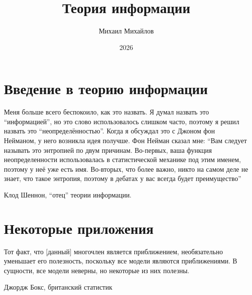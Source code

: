 \documentclass{lecturenotes}
\title{Теория информации}
\author{Михаил Михайлов}
\date{2026}
\begin{document}
\maketitle
\newpage
\tableofcontents
\newpage

\setlength{\epigraphwidth}{0.75\linewidth}
\renewcommand{\textflush}{flushepinormal}

\chapter{Введение в теорию информации}
\epigraph{Меня больше всего беспокоило, как это назвать. Я думал назвать это \enquote{информацией}, но это слово использовалось слишком часто, поэтому я решил назвать это \enquote{неопределённостью}. Когда я обсуждал это с Джоном фон Нейманом, у него возникла идея получше. Фон Нейман сказал мне: \enquote{Вам следует называть это энтропией по двум причинам. Во-первых, ваша функция неопределенности использовалась в статистической механике под этим именем, поэтому у неё уже есть имя. Во-вторых, что более важно, никто на самом деле не знает, что такое энтропия, поэтому в дебатах у вас всегда будет преимущество}}{Клод Шеннон, \enquote{отец} теории информации.}

\localtableofcontents






\chapter{Некоторые приложения}
\epigraph{Тот факт, что [данный] многочлен является приближением, необязательно уменьшает его полезность, поскольку все модели являются приближениями. В сущности, все модели неверны, но некоторые из них полезны.}{Джордж Бокс, британский статистик}

\localtableofcontents

\end{document}
